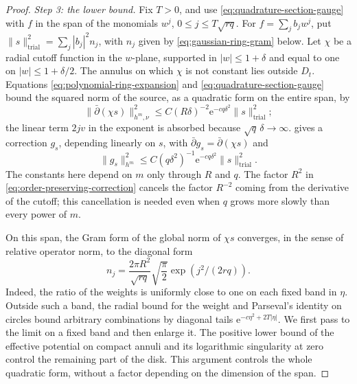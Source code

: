 \begin{proof}
\emph{Step 3: the lower bound.}
Fix $T>0$, and use \eqref{eq:quadrature-section-gauge} with
$f$ in the span of the monomials $w^j$, $0\leq j\leq T\sqrt{rq}$. For $f=\sum_jb_jw^j$, put $\|s\|_{\mathrm{trial}}^2=\sum_j|b_j|^2n_j$, with $n_j$ given by \eqref{eq:gaussian-ring-gram} below. Let $\chi$ be a radial cutoff function in the $w$-plane, supported in $|w|\leq1+\delta$ and equal to one on $|w|\leq1+\delta/2$.
The annulus on which $\chi$ is not constant lies outside $D_t$. Equations
\eqref{eq:polynomial-ring-expansion} and \eqref{eq:quadrature-section-gauge} bound the squared norm of the source, as a quadratic form on the entire span, by
\[
 \|\bar\partial(\chi s)\|_{h^m,\nu}^2\leq C(R\delta)^{-2}\mathrm{e}^{-cq\delta^2}\|s\|_{\mathrm{trial}}^2;
\]
the linear term $2jv$ in the exponent is absorbed because $\sqrt q\,\delta\to\infty$.
 gives a correction $g_s$, depending linearly on $s$, with $\bar\partial g_s=\bar\partial(\chi s)$ and
\begin{equation}\label{eq:shrinking-cutoff-correction}
 \|g_s\|_{h^m}^2\leq C(q\delta^2)^{-1}\mathrm{e}^{-cq\delta^2}\|s\|_{\mathrm{trial}}^2.
\end{equation}
The constants here depend on $m$ only through $R$ and $q$. The factor $R^2$ in \eqref{eq:order-preserving-correction} cancels the factor $R^{-2}$ coming from the derivative of the cutoff; this cancellation is needed even when $q$ grows more slowly than every power of $m$.

On this span, the Gram form of the global norm of $\chi s$ converges, in the sense of relative operator norm, to the diagonal form
\begin{equation}\label{eq:gaussian-ring-gram}
 n_j=\frac{2\pi R^2}{\sqrt{rq}}\sqrt{\frac\pi2}
          \exp(j^2/(2rq)).
\end{equation}
Indeed, the ratio of the weights is uniformly close to one on each fixed band in $\eta$. Outside such a band, the radial bound for the weight and Parseval's identity on circles bound arbitrary combinations by diagonal tails $\mathrm{e}^{-c\eta^2+2T|\eta|}$. We first pass to the limit on a fixed band and then enlarge it. The positive lower bound of the effective potential on compact annuli and its logarithmic singularity at zero control the remaining part of the disk. This argument controls the whole quadratic form, without a factor depending on the dimension of the span.


\end{proof}
